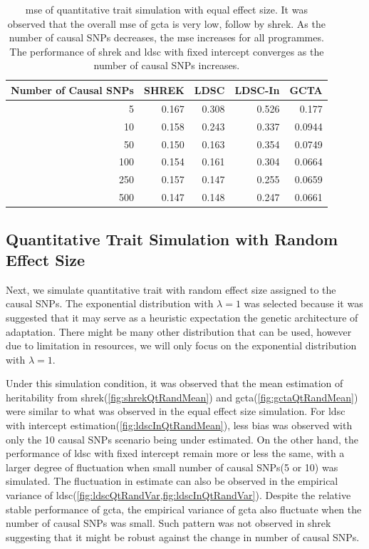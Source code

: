 		\begin{table}
			\centering
			\begin{tabular}{rrrrr}
				\toprule
				Number of Causal SNPs&	SHREK&	LDSC&	LDSC-In&	GCTA \\
				\midrule
				5	&	0.167	&	0.308&	0.526&	0.177	\\
				10	&	0.158	&	0.243&	0.337&	0.0944	\\
				50	&	0.150	&	0.163&	0.354&	0.0749	\\
				100	&	0.154	&	0.161&	0.304&	0.0664	\\
				250	&	0.157	&	0.147&	0.255&	0.0659	\\
				500	&	0.147	&	0.148&	0.247&	0.0661	\\
				\bottomrule
			\end{tabular}
			\caption[Mean Squared Error of Quantitative Trait Simulation with Equal Effect Size]{
				\gls{mse} of quantitative trait simulation with equal effect size.
				It was observed that the overall \gls{mse} of \gls{gcta} is very low, follow by \gls{shrek}.
				As the number of causal \glspl{SNP} decreases, the \gls{mse} increases for all programmes. 
				The performance of \gls{shrek} and \gls{ldsc} with fixed intercept converges as the number of causal \glspl{SNP} increases.}
			\label{tab:mseQtEqual}
		\end{table}
		
		\subsection{Quantitative Trait Simulation with Random Effect Size}
		
		Next, we simulate quantitative trait with random effect size assigned to the causal \glspl{SNP}.
		The exponential distribution with $\lambda=1$ was selected because it was suggested that it may serve as a heuristic expectation the genetic architecture of adaptation\citep{Orr1998}.
		There might be many other distribution that can be used, however due to limitation in resources, we will only focus on the exponential distribution with $\lambda=1$.

		Under this simulation condition, it was observed that the mean estimation of heritability from \gls{shrek}(\cref{fig:shrekQtRandMean}) and \gls{gcta}(\cref{fig:gctaQtRandMean}) were similar to what was observed in the equal effect size simulation.
		For \gls{ldsc} with intercept estimation(\cref{fig:ldscInQtRandMean}), less bias was observed with only the 10 causal \glspl{SNP} scenario being under estimated. 
		On the other hand, the performance of \gls{ldsc} with fixed intercept remain more or less the same, with a larger degree of fluctuation when small number of causal \glspl{SNP}(5 or 10) was simulated. 
		The fluctuation in estimate can also be observed in the empirical variance of \gls{ldsc}(\cref{fig:ldscQtRandVar,fig:ldscInQtRandVar}).
		Despite the relative stable performance of \gls{gcta}, the empirical variance of \gls{gcta} also fluctuate when the number of causal \glspl{SNP} was small. 
		Such pattern was not observed in \gls{shrek} suggesting that it might be robust against the change in number of causal \glspl{SNP}.
		
